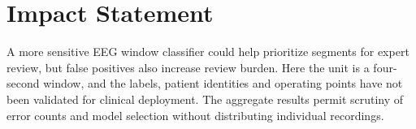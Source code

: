 \documentclass{article}
\begin{document}
\section*{Impact Statement}
A more sensitive EEG window classifier could help prioritize segments for expert review, but false positives also increase review burden. Here the unit is a four-second window, and the labels, patient identities and operating points have not been validated for clinical deployment. The aggregate results permit scrutiny of error counts and model selection without distributing individual recordings.



\clearpage
\appendix
\onecolumn


\end{document}
